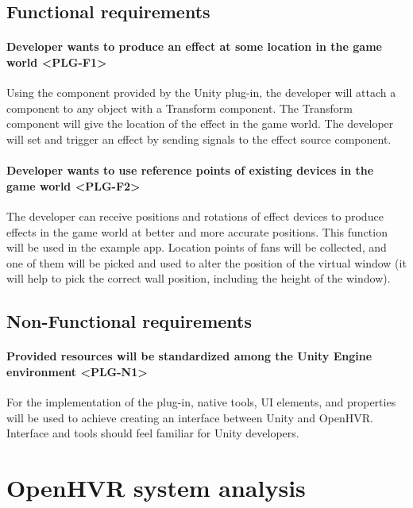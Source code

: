 \newpage

\subsection{Functional requirements}

\paragraph*{Developer wants to produce an effect at some location in the game world <PLG-F1>}
\label{plg-f1}
Using the component provided by the Unity plug-in, the developer will attach
a component to any object with a Transform component. The Transform component
will give the location of the effect in the game world. The developer will
set and trigger an effect by sending signals to the effect source component.

\paragraph*{Developer wants to use reference points of existing devices in the game world <PLG-F2>}
\label{plg-f2}
The developer can receive
positions and rotations of effect devices to produce effects in the
game world at better and more accurate positions.
This function will be used in the example app. Location points of
fans will be collected, and one of them will be picked and used to alter
the position of the virtual window (it will help to pick the correct wall position,
including the height of the window).

\subsection{Non-Functional requirements}

\paragraph*{Provided resources will be standardized among the Unity Engine environment <PLG-N1>}
\label{plg-n1}
For the implementation of the plug-in, native tools, UI elements, and properties
will be used to achieve creating an interface between Unity and OpenHVR.
Interface and tools should feel familiar for Unity developers.


\section{OpenHVR system analysis}

